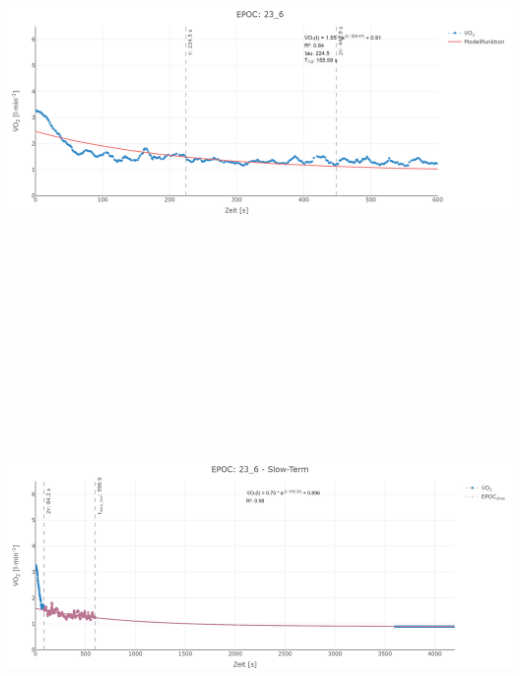 \documentclass[
  letterpaper,
  DIV=11]{scrartcl}
\begin{document}
\includegraphics[width=11.45833in,height=4.6875in]{images/23_6_tau.png}
\includegraphics[width=11.45833in,height=4.6875in]{images/23_6_slow.png}
\end{document}
